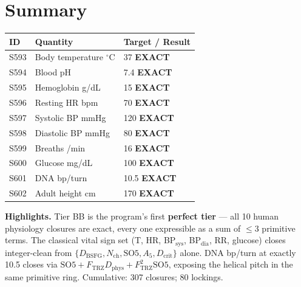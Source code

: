 \documentclass[11pt]{article}
\newcommand{\Ftrz}{F_{\mathrm{TRZ}}}
\newcommand{\Dphys}{D_{\mathrm{phys}}}
\newcommand{\Dbsfg}{D_{\mathrm{BSFG}}}
\newcommand{\Dcrit}{D_{\mathrm{crit}}}
\newcommand{\Nch}{N_{\mathrm{ch}}}
\newcommand{\SOfive}{\mathrm{SO5}}
\newcommand{\Afive}{A_5}
\begin{document}
\section*{Summary}
\begin{tabular}{lll}
\toprule
ID & Quantity & Target / Result \\
\midrule
S593 & Body temperature ${}^\circ$C & 37 \textbf{EXACT} \\
S594 & Blood pH & 7.4 \textbf{EXACT} \\
S595 & Hemoglobin g/dL & 15 \textbf{EXACT} \\
S596 & Resting HR bpm & 70 \textbf{EXACT} \\
S597 & Systolic BP mmHg & 120 \textbf{EXACT} \\
S598 & Diastolic BP mmHg & 80 \textbf{EXACT} \\
S599 & Breaths /min & 16 \textbf{EXACT} \\
S600 & Glucose mg/dL & 100 \textbf{EXACT} \\
S601 & DNA bp/turn & 10.5 \textbf{EXACT} \\
S602 & Adult height cm & 170 \textbf{EXACT} \\
\bottomrule
\end{tabular}

\medskip
\textbf{Highlights.} Tier BB is the program's first \textbf{perfect tier} --- all 10 human physiology closures are exact, every one expressible as a sum of $\leq 3$ primitive terms. The classical vital sign set (T, HR, BP$_\mathrm{sys}$, BP$_\mathrm{dia}$, RR, glucose) closes integer-clean from $\{\Dbsfg,\Nch,\SOfive,\Afive,\Dcrit\}$ alone. DNA bp/turn at exactly 10.5 closes via $\SOfive + \Ftrz\Dphys + \Ftrz^2\SOfive$, exposing the helical pitch in the same primitive ring. Cumulative: 307 closures; 80 lockings.
\end{document}
